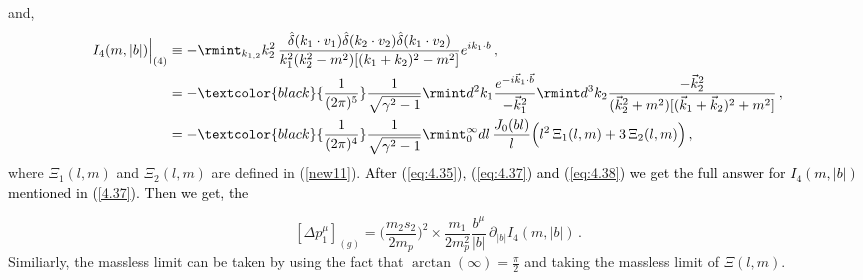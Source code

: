  and,
 \begin{align}
     \begin{split}
         I_{4}(m,|b|)\Big|_{(4)}&\equiv -\rmint_{k_{1,2}}k_2^2\,\frac{\hat\delta(k_1\cdot v_1) \hat\delta(k_2\cdot v_2)\hat\delta(k_1\cdot v_2)}{k_1^2(k_2^2-m^2)[(k_1+k_2)^2-m^2]}e^{i k_1\cdot b}\,,\\ &
         =-\textcolor{black}{\frac{1}{(2\pi)^5}}\frac{1}{\sqrt{\gamma^2-1}}\rmint d^2 k_1\frac{e^{-i\vec k_1\cdot \vec b }}{-\vec k_1^2}\rmint d^3 k_2 \frac{-\vec k_2^2}{(\vec k_2^2+m^2)[(\vec k_1+\vec k_2)^2+m^2]}\,,\\ &
         =-\textcolor{black}{\frac{1}{(2\pi)^4}}\frac{1}{\sqrt{\gamma^2-1}}\rmint_0^{\infty} dl\, \frac{J_{0}(bl)}{l}\Big(l^2\,{\Xi}_1(l,m)+3\,{\Xi}_2(l,m)\Big)\,, \label{eq:4.38}
     \end{split}
 \end{align}
 where ${\Xi}_1(l,m)$ and ${\Xi}_2(l,m)$ are defined in (\ref{new11}). 
\textcolor{black}{After (\ref{eq:4.35}), (\ref{eq:4.37}) and (\ref{eq:4.38}) we get the full answer for $I_{4}(m,|b|)$ mentioned in (\ref{4.37}). Then we get, the }

\begin{equation}\label{e:barwqpp}
 [\Delta p_1^{\mu}]_{(g)}=\Big(\frac{m_2s_2}{2m_p}\Big)^2\times \frac{m_1}{2m_p^2}\frac{b^\mu}{|b|}\,\partial_{|b|} I_{4}(m,|b|)\,.
\end{equation}
Similiarly, the massless limit can be taken by using the fact that $\arctan(\infty)=\frac{\pi}{2}$ and taking the massless limit of $\Xi(l,m)$.

